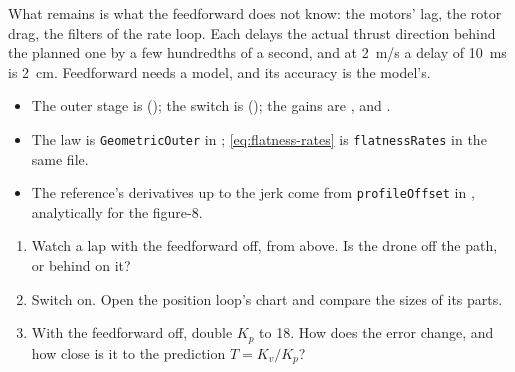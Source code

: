 What remains is what the feedforward does not know: the motors' lag, the rotor drag, the filters of the rate loop. Each delays the actual thrust direction behind the planned one by a few hundredths of a second, and at \SI{2}{m/s} a delay of \SI{10}{ms} is \SI{2}{cm}. Feedforward needs a model, and its accuracy is the model's.


\begin{inapp}
\begin{itemize}[leftmargin=1.2em]
  \item The outer stage is  (); the switch is  (); the gains are ,  and .
  \item The law is \texttt{GeometricOuter} in ; \cref{eq:flatness-rates} is \texttt{flatnessRates} in the same file.
  \item The reference's derivatives up to the jerk come from \texttt{profileOffset} in , analytically for the figure-8.
\end{itemize}
\end{inapp}

\begin{trythis}
\begin{enumerate}
  \item Watch a lap with the feedforward off, from above. Is the drone off the path, or behind on it?
  \item Switch  on. Open the position loop's chart and compare the sizes of its parts.
  \item With the feedforward off, double $K_p$ to 18. How does the error change, and how close is it to the prediction $T = K_v/K_p$?
\end{enumerate}
\end{trythis}

